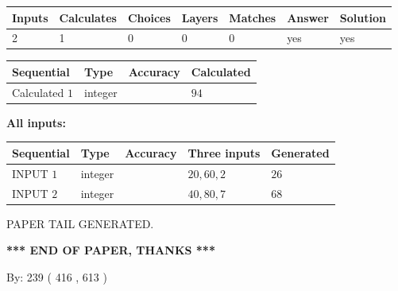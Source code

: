 \documentclass{ctexart}
\begin{document}
   
\noindent\begin{tabular}{|l|l|l|l|l|l|l|}
 \hline
Inputs & Calculates & Choices & Layers & Matches & Answer & Solution \\ \hline
 2  & 
 1  & 
 0
  & 
 0  & 
 0  & 
  yes & 
  yes 
  \\ \hline
 \end{tabular}
   
   
   
   
\noindent{}
   
   
  
  
\noindent\begin{tabular}{|l|l|l|l|}
\hline
 Sequential & Type & Accuracy & Calculated \\ 
\hline
 
 
  Calculated $  1 $ & integer &  & 
  $ 94 $ 
 \\  \hline  
 \end{tabular}
   
   
   
   
\noindent\vspace{0.1in}\hspace{-0.08in} {\textbf{\Large{All inputs: }}}
   
   
  
  
\noindent\begin{tabular}{|l|l|l|l|l|}
\hline
 Sequential & Type & Accuracy & Three inputs & Generated \\ 
\hline
 
 
  INPUT $  1 $ & integer &  & $
 20
 , 
 60
 , 
 2
 $ & $ 26 $ 
 \\  \hline  
 
 
  INPUT $  2 $ & integer &  & $
 40
 , 
 80
 , 
 7
 $ & $ 68 $ 
 \\  \hline  
 \end{tabular}
   
   
   
   
   
   
 \vspace{0.2in}
 
   
   
\vspace{2.0in} PAPER TAIL GENERATED.
   
   
   
   
\vspace{1.0in} 
{\textbf{\large{ *** END OF PAPER, THANKS *** }}} 
   
   
\hspace{1.0in} By: 
 239 ( 416 ,  613 )
   
\end{document}
